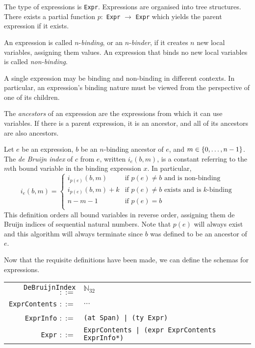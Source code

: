 \documentclass[11pt]{book}
\begin{document}
The type of expressions is \lstinline{Expr}.
Expressions are organised into tree structures.
There exists a partial function \( p : \) \lstinline{Expr} \( \to \) \lstinline{Expr} which yields the parent expression if it exists.

\begin{defn}
    An expression is called \( n \)-\textit{binding}, or an \( n \)-\textit{binder}, if it creates \( n \) new local variables, assigning them values.
    An expression that binds no new local variables is called \textit{non-binding}.

    A single expression may be binding and non-binding in different contexts.
    In particular, an expression's binding nature must be viewed from the perspective of one of its children.
\end{defn}

\begin{defn}
    The \textit{ancestors} of an expression are the expressions from which it can use variables.
    If there is a parent expression, it is an ancestor, and all of its ancestors are also ancestors.
\end{defn}

\begin{defn}
    Let \( e \) be an expression, \( b \) be an \( n \)-binding ancestor of \( e \), and \( m \in \qty{0, \dots, n-1} \).
    The \textit{de Bruijn index} of \( c \) from \( e \), written \( i_e(b, m) \), is a constant referring to the \( m \)th bound variable in the binding expression \( x \).
    In particular,
    \[ i_e(b, m) = \begin{cases}
        i_{p(e)}(b, m) & \text{if } p(e) \neq b \text{ and is non-binding} \\
        i_{p(e)}(b, m) + k & \text{if } p(e) \neq b \text{ exists and is } k \text{-binding} \\
        n - m - 1 & \text{if } p(e) = b \\
    \end{cases} \]
    This definition orders all bound variables in reverse order, assigning them de Bruijn indices of sequential natural numbers.
    Note that \( p(e) \) will always exist and this algorithm will always terminate since \( b \) was defined to be an ancestor of \( e \).
\end{defn}

Now that the requisite definitions have been made, we can define the schemas for expressions.

\begin{tabular}{r l p{7cm}}
    \lstinline!DeBruijnIndex! \( ::= \) & \( \mathbb N_{32} \) \\
    \lstinline!ExprContents! \( ::= \) & \( \dots \) \\
    \lstinline!ExprInfo! \( ::= \) & \lstinline!(at Span) | (ty Expr)! \\
    \lstinline!Expr! \( ::= \) & \lstinline!ExprContents | (expr ExprContents ExprInfo*)!
\end{tabular}
\end{document}
